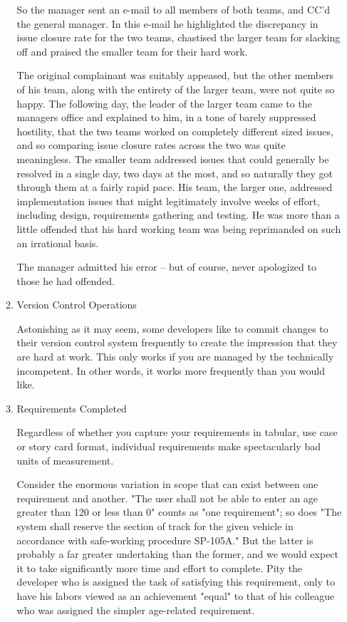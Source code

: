 \documentclass{article}
\begin{document}
\begin{enumerate}
\begin{enumerate}
So the manager sent an e-mail to all members of both teams, and CC'd the
general manager. In this e-mail he highlighted the discrepancy in issue
closure rate for the two teams, chastised the larger team for slacking
off and praised the smaller team for their hard work.

The original complainant was suitably appeased, but the other members of
his team, along with the entirety of the larger team, were not quite so
happy. The following day, the leader of the larger team came to the
managers office and explained to him, in a tone of barely suppressed
hostility, that the two teams worked on completely different sized
issues, and so comparing issue closure rates across the two was quite
meaningless. The smaller team addressed issues that could generally be
resolved in a single day, two days at the most, and so naturally they
got through them at a fairly rapid pace. His team, the larger one,
addressed implementation issues that might legitimately involve weeks of
effort, including design, requirements gathering and testing. He was
more than a little offended that his hard working team was being
reprimanded on such an irrational basis.

The manager admitted his error -- but of course, never apologized to
those he had offended.

\item Version Control Operations
\label{sec:orgheadline172}

Astonishing as it may seem, some developers like to commit changes to
their version control system frequently to create the impression that
they are hard at work. This only works if you are managed by the
technically incompetent. In other words, it works more frequently than
you would like.

\item Requirements Completed
\label{sec:orgheadline173}

Regardless of whether you capture your requirements in tabular, use case
or story card format, individual requirements make spectacularly bad
units of measurement.

Consider the enormous variation in scope that can exist between one
requirement and another. "The user shall not be able to enter an age
greater than 120 or less than 0" counts as "one requirement"; so does
"The system shall reserve the section of track for the given vehicle in
accordance with safe-working procedure SP-105A." But the latter is
probably a far greater undertaking than the former, and we would expect
it to take significantly more time and effort to complete. Pity the
developer who is assigned the task of satisfying this requirement, only
to have his labors viewed as an achievement "equal" to that of his
colleague who was assigned the simpler age-related requirement.


\end{enumerate}
\end{enumerate}
\end{document}
